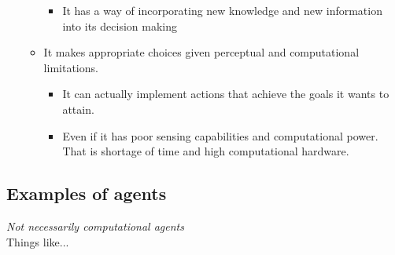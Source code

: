 \documentclass[12pt]{article}
\begin{document}
\begin{itemize}
\begin{itemize}
        \begin{itemize}
            \item It has a way of incorporating new knowledge and new information into its decision making 
        \end{itemize}
        \item It makes appropriate choices given perceptual and computational limitations.
        \begin{itemize}
            \item It can actually implement actions that achieve the goals it wants to attain. 
            \item Even if it has poor sensing capabilities and computational power. That is shortage of time and high computational hardware.
        \end{itemize}
    \end{itemize}
\end{itemize}


\subsection{Examples of agents}

\emph{Not necessarily computational agents}\\

\noindent Things like...
\end{document}
